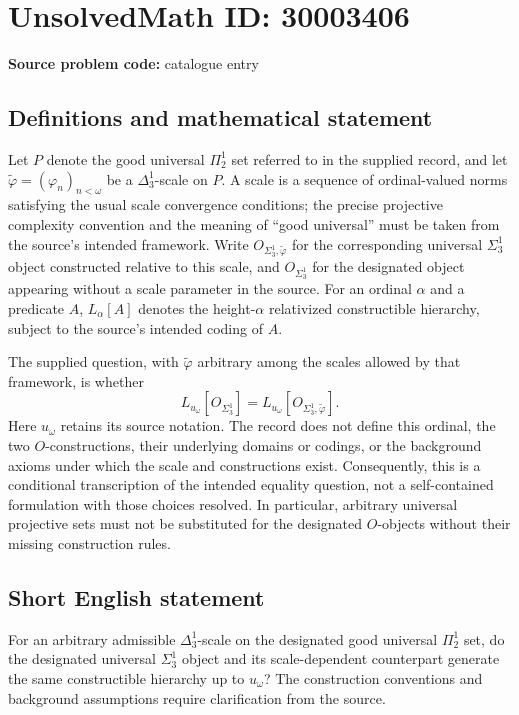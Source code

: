 \documentclass[11pt]{article}
\begin{document}
\section*{UnsolvedMath ID: 30003406}
\textbf{Source problem code:} catalogue entry
\subsection{Definitions and mathematical statement}
Let \(P\) denote the good universal \(\Pi^1_2\) set referred to in the supplied record, and let \(\widetilde\varphi=(\varphi_n)_{n<\omega}\) be a \(\Delta^1_3\)-scale on \(P\). A scale is a sequence of ordinal-valued norms satisfying the usual scale convergence conditions; the precise projective complexity convention and the meaning of ``good universal'' must be taken from the source's intended framework. Write \(O_{\Sigma^1_3,\widetilde\varphi}\) for the corresponding universal \(\Sigma^1_3\) object constructed relative to this scale, and \(O_{\Sigma^1_3}\) for the designated object appearing without a scale parameter in the source. For an ordinal \(\alpha\) and a predicate \(A\), \(L_\alpha[A]\) denotes the height-\(\alpha\) relativized constructible hierarchy, subject to the source's intended coding of \(A\).

The supplied question, with \(\widetilde\varphi\) arbitrary among the scales allowed by that framework, is whether
\[
L_{u_\omega}[O_{\Sigma^1_3}]
=
L_{u_\omega}[O_{\Sigma^1_3,\widetilde\varphi}].
\]
Here \(u_\omega\) retains its source notation. The record does not define this ordinal, the two \(O\)-constructions, their underlying domains or codings, or the background axioms under which the scale and constructions exist. Consequently, this is a conditional transcription of the intended equality question, not a self-contained formulation with those choices resolved. In particular, arbitrary universal projective sets must not be substituted for the designated \(O\)-objects without their missing construction rules.
\subsection{Short English statement}
For an arbitrary admissible \(\Delta^1_3\)-scale on the designated good universal \(\Pi^1_2\) set, do the designated universal \(\Sigma^1_3\) object and its scale-dependent counterpart generate the same constructible hierarchy up to \(u_\omega\)? The construction conventions and background assumptions require clarification from the source.
\end{document}
